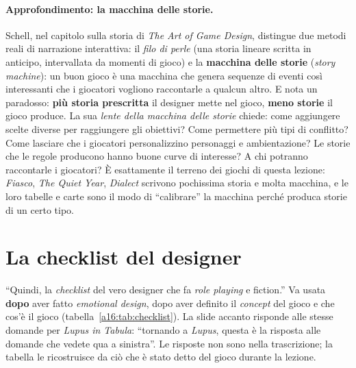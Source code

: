 \paragraph{Approfondimento: la macchina delle storie.} Schell, nel capitolo sulla storia di \emph{The
Art of Game Design}, distingue due metodi reali di narrazione interattiva: il \emph{filo di perle}
(una storia lineare scritta in anticipo, intervallata da momenti di gioco) e la \textbf{macchina delle
storie} (\emph{story machine}): un buon gioco è una macchina che genera sequenze di eventi così
interessanti che i giocatori vogliono raccontarle a qualcun altro. E nota un paradosso: \textbf{più
storia prescritta} il designer mette nel gioco, \textbf{meno storie} il gioco produce. La sua
\emph{lente della macchina delle storie} chiede: come aggiungere scelte diverse per raggiungere gli
obiettivi? Come permettere più tipi di conflitto? Come lasciare che i giocatori personalizzino
personaggi e ambientazione? Le storie che le regole producono hanno buone curve di interesse? A chi
potranno raccontarle i giocatori? È esattamente il terreno dei giochi di questa lezione: \emph{Fiasco},
\emph{The Quiet Year}, \emph{Dialect} scrivono pochissima storia e molta macchina, e le loro tabelle e
carte sono il modo di ``calibrare'' la macchina perché produca storie di un certo tipo.

\section{La checklist del designer}
\label{a16:sec:checklist}



``Quindi, la \emph{checklist} del vero designer che fa \emph{role playing} e fiction.'' Va usata
\textbf{dopo} aver fatto \emph{emotional design}, dopo aver definito il \emph{concept} del gioco e
che cos'è il gioco (tabella~\ref{a16:tab:checklist}). La slide accanto risponde alle stesse domande
per \emph{Lupus in Tabula}: ``tornando a \emph{Lupus}, questa è la risposta alle domande che vedete
qua a sinistra''. Le risposte non sono nella trascrizione; la tabella le ricostruisce da ciò che è
stato detto del gioco durante la lezione.

